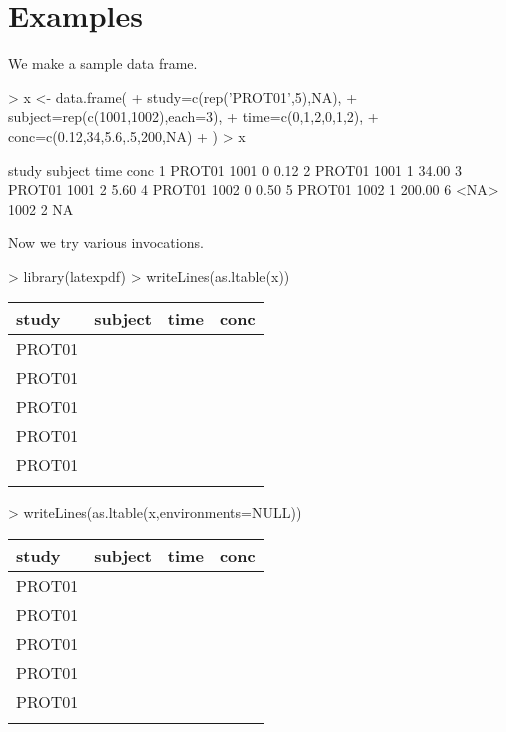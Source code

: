 \documentclass[titlepage]{article}
\begin{document}
\section*{Examples}
We make a sample data frame.
\begin{Schunk}
\begin{Sinput}
> x <- data.frame(
+   study=c(rep('PROT01',5),NA),
+   subject=rep(c(1001,1002),each=3),
+   time=c(0,1,2,0,1,2),
+   conc=c(0.12,34,5.6,.5,200,NA)
+ )
> x
\end{Sinput}
\begin{Soutput}
   study subject time   conc
1 PROT01    1001    0   0.12
2 PROT01    1001    1  34.00
3 PROT01    1001    2   5.60
4 PROT01    1002    0   0.50
5 PROT01    1002    1 200.00
6   <NA>    1002    2     NA
\end{Soutput}
\end{Schunk}
Now we try various invocations.
\begin{Schunk}
\begin{Sinput}
> library(latexpdf)
> writeLines(as.ltable(x))
\end{Sinput}
\begin{table}[H]
 \begin{center}
  \begin{tabular}{lrrr}
    \hline \hline
   study & subject & time & conc \\ \hline
   PROT01 & \verb#1001# & \verb#0# & \verb#0.12# \\
   PROT01 & \verb#1001# & \verb#1# & \verb#34.00# \\
   PROT01 & \verb#1001# & \verb#2# & \verb#5.60# \\
   PROT01 & \verb#1002# & \verb#0# & \verb#0.50# \\
   PROT01 & \verb#1002# & \verb#1# & \verb#200.00# \\
    & \verb#1002# & \verb#2# & \verb## \\ \hline
  \end{tabular}
 \end{center}
\end{table}\end{Schunk}
\begin{Schunk}
\begin{Sinput}
> writeLines(as.ltable(x,environments=NULL))
\end{Sinput}
\begin{table}[H]
 \begin{tabular}{lrrr}
   \hline \hline
  study & subject & time & conc \\ \hline
  PROT01 & \verb#1001# & \verb#0# & \verb#0.12# \\
  PROT01 & \verb#1001# & \verb#1# & \verb#34.00# \\
  PROT01 & \verb#1001# & \verb#2# & \verb#5.60# \\
  PROT01 & \verb#1002# & \verb#0# & \verb#0.50# \\
  PROT01 & \verb#1002# & \verb#1# & \verb#200.00# \\
   & \verb#1002# & \verb#2# & \verb## \\ \hline
 \end{tabular}
\end{table}\end{Schunk}
\end{document}
